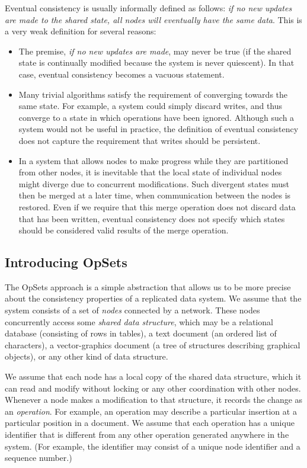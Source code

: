 Eventual consistency is usually informally defined as follows: \emph{if no new updates are made to the shared state, all nodes will eventually have the same data}.
This is a very weak definition for several reasons:
\begin{itemize}
\item The premise, \emph{if no new updates are made}, may never be true (if the shared state is continually modified because the system is never quiescent).
In that case, eventual consistency becomes a vacuous statement.

\item Many trivial algorithms satisfy the requirement of converging towards the same state.
For example, a system could simply discard writes, and thus converge to a state in which operations have been ignored.
Although such a system would not be useful in practice, the definition of eventual consistency does not capture the requirement that writes should be persistent.

\item In a system that allows nodes to make progress while they are partitioned from other nodes, it is inevitable that the local state of individual nodes might diverge due to concurrent modifications.
Such divergent states must then be merged at a later time, when communication between the nodes is restored.
Even if we require that this merge operation does not discard data that has been written, eventual consistency does not specify which states should be considered valid results of the merge operation.
\end{itemize}

\subsection{Introducing OpSets}

The OpSets approach is a simple abstraction that allows us to be more precise about the consistency properties of a replicated data system.
We assume that the system consists of a set of \emph{nodes} connected by a network.
These nodes concurrently access some \emph{shared data structure}, which may be a relational database (consisting of rows in tables), a text document (an ordered list of characters), a vector-graphics document (a tree of structures describing graphical objects), or any other kind of data structure.

We assume that each node has a local copy of the shared data structure, which it can read and modify without locking or any other coordination with other nodes.
Whenever a node makes a modification to that structure, it records the change as an \emph{operation}.
For example, an operation may describe a particular insertion at a particular position in a document.
We assume that each operation has a unique identifier that is different from any other operation generated anywhere in the system.
(For example, the identifier may consist of a unique node identifier and a sequence number.)

